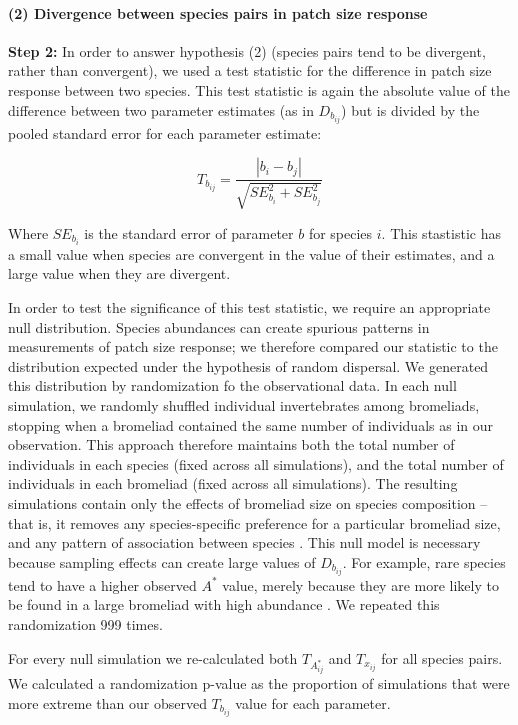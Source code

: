 \paragraph{(2) Divergence between species pairs in patch size
response}\label{divergence-between-species-pairs-in-patch-size-response}

\textbf{Step 2:} In order to answer hypothesis (2) (species pairs tend to be divergent, rather than convergent), we used a test statistic for the difference in patch size response between two species.  This test statistic is again the absolute value of the difference between two parameter estimates (as in \(D_{b_{ij}}\)) but is divided by the pooled standard error for each parameter estimate:

\[T_{b_{ij}} = \frac{|b_{i} - b_{j}|}{\sqrt{SE_{b_{i}}^{2} + SE_{b_{j}}^{2}}}\]

Where \(SE_{b_{i}}\) is the standard error of parameter \(b\) for species \(i\). This stastistic has a small value when species are convergent in the value of their estimates, and a large value when they are divergent. 

In order to test the significance of this test statistic, we require an appropriate null distribution. Species abundances can create spurious patterns in measurements of
patch size response; we therefore compared our statistic to the distribution expected under the hypothesis of random dispersal. We generated this distribution by randomization fo the observational data. In each null simulation,
we randomly shuffled individual invertebrates among bromeliads, stopping
when a bromeliad contained the same number of individuals as in our
observation. This approach therefore maintains both the total number of
individuals in each species (fixed across all simulations), and the
total number of individuals in each bromeliad (fixed across all
simulations). The resulting simulations contain only the effects of
bromeliad size on species composition -- that is, it removes any
species-specific preference for a particular bromeliad size, and any
pattern of association between species \citep{Ulrich2012}. This null
model is necessary because sampling effects can create large values of
\(D_{b_{ij}}\). For example, rare species tend to have a higher observed
\(A^{*}\) value, merely because they are more likely to be found in a
large bromeliad with high abundance \citep{Srivastava2008}. We repeated
this randomization 999 times. 


For every null simulation we re-calculated both 
 \(T_{A^{*}_{ij}}\) and \(T_{x_{ij}}\) for all
species pairs. We calculated a randomization p-value as the proportion of
simulations that were more extreme than our observed \(T_{b_{ij}}\)
value for each parameter.

